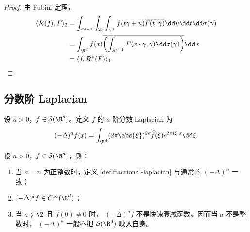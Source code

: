 \begin{proof}
	由 Fubini 定理，
	\[
	\begin{aligned}
	\langle\mathcal R(f),F\rangle_2
	&=\int_{S^{d-1}}\int_{\R}\int_{\gamma^\perp}
	f(t\gamma+u)\overline{F(t,\gamma)}
	\dd u\dd t\dd\sigma(\gamma)\\
	&=\int_{\R^d}f(x)
	\overline{\left(\int_{S^{d-1}}F(x\cdot\gamma,\gamma)
	\dd\sigma(\gamma)\right)}\dd x\\
	&=\langle f,\mathcal R^*(F)\rangle_1.
	\end{aligned}
	\]
\end{proof}

\subsection*{分数阶 Laplacian}

\begin{definition}\label{def:fractional-laplacian}
	设 $a>0$，$f\in\mathcal S(\R^d)$。定义 $f$ 的
	$a$ 阶分数 Laplacian 为
	\[
	(-\Delta)^a f(x)
	=\int_{\R^d}(2\pi\abs{\xi})^{2a}
	\widehat f(\xi)e^{2\pi i\xi\cdot x}\dd\xi.
	\]
\end{definition}

\begin{proposition}\label{prop:fractional-laplacian-properties}
	设 $a>0$，$f\in\mathcal S(\R^d)$，则：
	\begin{enumerate}[label=(\alph*)]
		\item 当 $a=n$ 为正整数时，定义
		\ref{def:fractional-laplacian} 与通常的 $(-\Delta)^n$ 一致；

		\item $(-\Delta)^a f\in C^\infty(\R^d)$；

		\item 当 $a\notin\Z$ 且 $\widehat f(0)\neq0$ 时，
		$(-\Delta)^a f$ 不是快速衰减函数。因而当 $a$ 不是整数时，
		$(-\Delta)^a$ 一般不把 $\mathcal S(\R^d)$ 映入自身。
	\end{enumerate}
\end{proposition}

